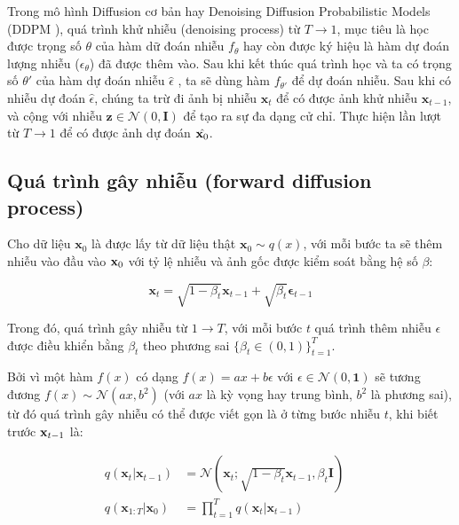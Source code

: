 Trong mô hình Diffusion cơ bản hay Denoising Diffusion Probabilistic Models (DDPM \cite{ho2020denoising}), quá trình khử nhiễu (denoising process) từ $T \to 1$, mục tiêu là học được trọng số $\theta$ của hàm dữ đoán nhiễu $f_{\theta}$ hay còn được ký hiệu là hàm dự đoán lượng nhiễu ($\epsilon_\theta$) đã được thêm vào. Sau khi kết thúc quá trình học và ta có trọng số $\theta'$ của hàm dự đoán nhiễu $\hat{\epsilon}$ , ta sẽ dùng hàm $f_{\theta'}$ để dự đoán nhiễu. Sau khi có nhiễu dự đoán $\hat{\epsilon}$, chúng ta trừ đi ảnh bị nhiễu $\mathbf{x}_{t}$ để có được ảnh khử nhiễu $\mathbf{x}_{t-1}$, và cộng với nhiễu $ \mathbf{z} \in \mathcal{N}(0, \mathbf{I})$ để tạo ra sự đa dạng cử chỉ. Thực hiện lần lượt từ $T \to 1$ để có được ảnh dự đoán $\hat{\mathbf{x}_0}$.

\subsection{Quá trình gây nhiễu (forward diffusion process)}

Cho dữ liệu $\mathbf{x}_{0}$ là được lấy từ dữ liệu thật $\mathbf{x}_{0} \sim q(x)$, với mỗi bước ta sẽ thêm nhiễu vào đầu vào $\mathbf{x}_{0}$ với tỷ lệ nhiễu và ảnh gốc được kiểm soát bằng hệ số $\beta$:


\begin{equation}
	\label{eq:addgaussian}
	\mathbf{x}_t = \sqrt{1 - \beta_t}\mathbf{x}_{t-1} + \sqrt{\beta_t} \boldsymbol{\epsilon}_{t-1}
\end{equation}


Trong đó, quá trình gây nhiễu từ $1 \to T$, với mỗi bước $t$ quá trình thêm nhiễu $\epsilon$ được điều khiển bằng $\beta_t$ theo phương sai $\{\beta_t \in (0, 1)\}_{t=1}^T$.

Bởi vì một hàm $f(x)$ có dạng $f(x) = a x + b\epsilon$ với $\epsilon \in \mathcal{N}(0, \mathbf{1})$ sẽ tương đương $f(x) \sim \mathcal{N}(a x, b^2)$ (với $a x$ là kỳ vọng hay trung bình, $b^2$ là phương sai), từ đó quá trình gây nhiễu có thể được viết gọn là ở từng bước nhiễu $t$, khi biết trước $\mathbf{x}_{t-1}$ là:

\begin{equation}
	\label{eq:forward_diffusion_process}
	\begin{aligned}
		q(\mathbf{x}_t \vert \mathbf{x}_{t-1}) &= \mathcal{N}(\mathbf{x}_t; \sqrt{1 - \beta_t} \mathbf{x}_{t-1}, \beta_t\mathbf{I}) \quad \\
		q(\mathbf{x}_{1:T} \vert \mathbf{x}_0) &= \prod^T_{t=1} q(\mathbf{x}_t \vert \mathbf{x}_{t-1})
	\end{aligned}
\end{equation}

